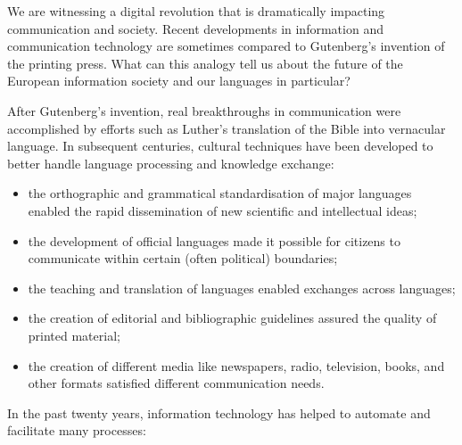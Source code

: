 \clearpage


\begin{multicols}{2}

We are witnessing a digital revolution that is dramatically impacting communication and society. Recent developments in information and communication technology are sometimes compared to Gutenberg’s invention of the printing press. What can this analogy tell us about the future of the European information society and our languages in particular?


After Gutenberg’s invention, real breakthroughs in communication were accomplished by efforts such as Luther’s translation of the Bible into vernacular language. In subsequent centuries, cultural techniques have been developed to better handle language processing and knowledge exchange:

\begin{itemize}
\item the orthographic and grammatical standardisation of major languages enabled the rapid dissemination of new scientific and intellectual ideas;
\item the development of official languages made it possible for citizens to communicate within certain (often political) boundaries;
\item the teaching and translation of languages enabled exchanges across languages;
\item the creation of editorial and bibliographic guidelines assured the quality of printed material;
\item the creation of different media like newspapers, radio, television, books, and other formats satisfied different communication needs. 
\end{itemize}

In the past twenty years, information technology has helped to automate and facilitate many processes:


\end{multicols}

